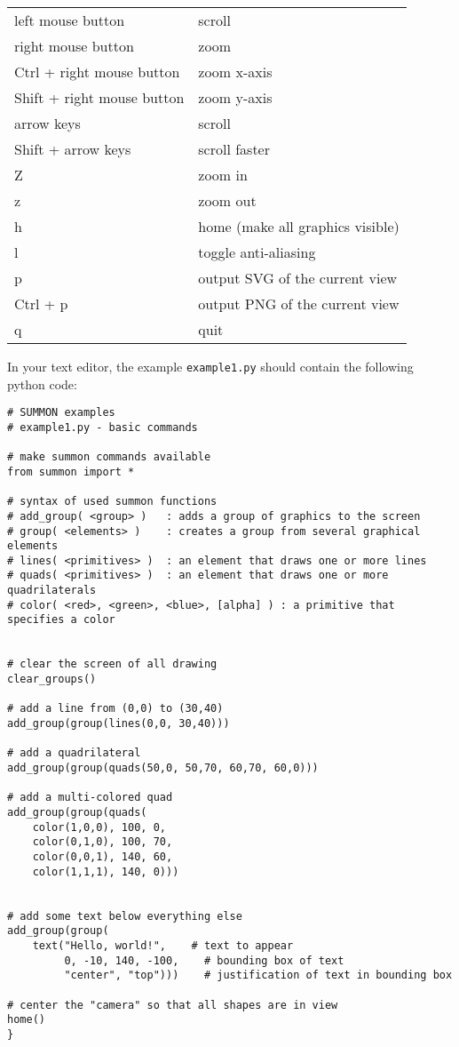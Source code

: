 \documentclass[12pt]{article}
\newcommand{\code}[1]{{\tt #1}}
\begin{document}
\vspace{.1in}
\begin{tabular}{ll}
    left mouse button          & scroll \\
    right mouse button         & zoom \\
    Ctrl + right mouse button  & zoom x-axis \\
    Shift + right mouse button & zoom y-axis \\
    arrow keys                 & scroll \\
    Shift + arrow keys         & scroll faster \\
    Z                          & zoom in \\
    z                          & zoom out \\
    h                          & home (make all graphics visible) \\
    l                          & toggle anti-aliasing \\
    p                          & output SVG of the current view \\
    Ctrl + p                   & output PNG of the current view \\
    q                          & quit \\
\end{tabular}
\vspace{.2in}



In your text editor, the example \code{example1.py} should contain the 
following python code:

{\small
\begin{verbatim}
# SUMMON examples
# example1.py - basic commands

# make summon commands available
from summon import *

# syntax of used summon functions
# add_group( <group> )   : adds a group of graphics to the screen
# group( <elements> )    : creates a group from several graphical elements
# lines( <primitives> )  : an element that draws one or more lines
# quads( <primitives> )  : an element that draws one or more quadrilaterals
# color( <red>, <green>, <blue>, [alpha] ) : a primitive that specifies a color


# clear the screen of all drawing
clear_groups()

# add a line from (0,0) to (30,40)
add_group(group(lines(0,0, 30,40)))

# add a quadrilateral
add_group(group(quads(50,0, 50,70, 60,70, 60,0)))

# add a multi-colored quad
add_group(group(quads(
    color(1,0,0), 100, 0,
    color(0,1,0), 100, 70,
    color(0,0,1), 140, 60,
    color(1,1,1), 140, 0)))


# add some text below everything else
add_group(group(
    text("Hello, world!",    # text to appear
         0, -10, 140, -100,    # bounding box of text
         "center", "top")))    # justification of text in bounding box

# center the "camera" so that all shapes are in view
home()
}


\end{verbatim}
}
\end{document}
